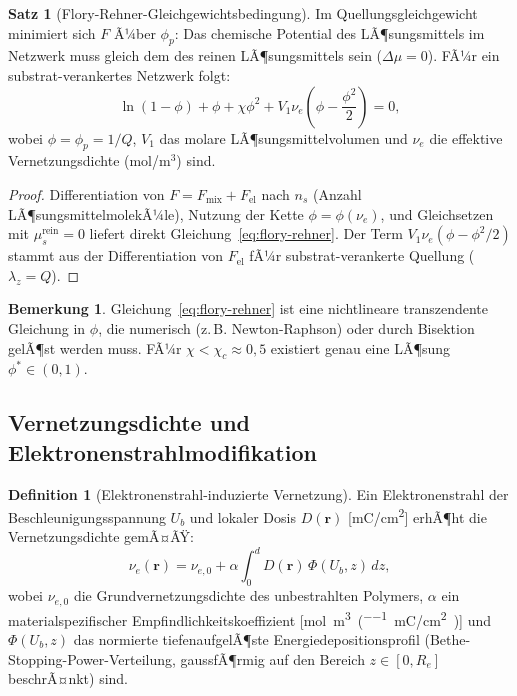 ﻿\documentclass[a4paper,12pt]{article}
\theoremstyle{definition}
\newtheorem{definition}{Definition}[section]
\newtheorem{satz}{Satz}[section]
\newtheorem{bemerkung}{Bemerkung}[section]
\newcommand{\vect}[1]{\bm{#1}}
\begin{document}
	\begin{satz}[Flory-Rehner-Gleichgewichtsbedingung]
		\label{satz:flory-rehner}
		Im Quellungsgleichgewicht minimiert sich $F$ Ã¼ber $\phi_p$:
		Das chemische Potential des LÃ¶sungsmittels im Netzwerk muss gleich dem
		des reinen LÃ¶sungsmittels sein ($\Delta\mu = 0$). FÃ¼r ein substrat-verankertes
		Netzwerk folgt:
		\begin{equation}
			\ln(1-\phi) + \phi + \chi\phi^2 + V_1 \nu_e \left(\phi - \frac{\phi^2}{2}\right) = 0,
			\label{eq:flory-rehner}
		\end{equation}
		wobei $\phi = \phi_p = 1/Q$, $V_1$ das molare LÃ¶sungsmittelvolumen und
		$\nu_e$ die effektive Vernetzungsdichte (mol/m$^3$) sind.
	\end{satz}
	
	\begin{proof}
		Differentiation von $F = F_\mathrm{mix} + F_\mathrm{el}$ nach $n_s$
		(Anzahl LÃ¶sungsmittelmolekÃ¼le), Nutzung der Kette $\phi = \phi(\nu_e)$,
		und Gleichsetzen mit $\mu_s^\mathrm{rein} = 0$ liefert direkt
		Gleichung~\eqref{eq:flory-rehner}.
		Der Term $V_1\nu_e(\phi - \phi^2/2)$ stammt aus der Differentiation
		von $F_\mathrm{el}$ fÃ¼r substrat-verankerte Quellung ($\lambda_z = Q$).
	\end{proof}
	
	\begin{bemerkung}
		Gleichung~\eqref{eq:flory-rehner} ist eine nichtlineare transzendente
		Gleichung in $\phi$, die numerisch (z.\,B. Newton-Raphson) oder
		durch Bisektion gelÃ¶st werden muss. FÃ¼r $\chi < \chi_c \approx 0{,}5$
		existiert genau eine LÃ¶sung $\phi^* \in (0,1)$.
	\end{bemerkung}
	
	\subsection{Vernetzungsdichte und Elektronenstrahlmodifikation}
	
	\begin{definition}[Elektronenstrahl-induzierte Vernetzung]
		\label{def:ebeam-vernetzung}
		Ein Elektronenstrahl der Beschleunigungsspannung $U_b$ und lokaler Dosis
		$D(\vect{r})$ [\si{mC/cm^2}] erhÃ¶ht die Vernetzungsdichte gemÃ¤ÃŸ:
		\begin{equation}
			\nu_e(\vect{r}) = \nu_{e,0} + \alpha \int_0^d D(\vect{r})\,\Phi(U_b, z)\, dz,
			\label{eq:ebeam-vernetzung}
		\end{equation}
		wobei $\nu_{e,0}$ die Grundvernetzungsdichte des unbestrahlten Polymers,
		$\alpha$ ein materialspezifischer Empfindlichkeitskoeffizient
		[\si{mol\per m^3\per (mC/cm^2)}] und $\Phi(U_b, z)$ das normierte
		tiefenaufgelÃ¶ste Energiedepositionsprofil (Bethe-Stopping-Power-Verteilung,
		gaussfÃ¶rmig auf den Bereich $z \in [0, R_e]$ beschrÃ¤nkt) sind.
	\end{definition}
	
\end{document}
